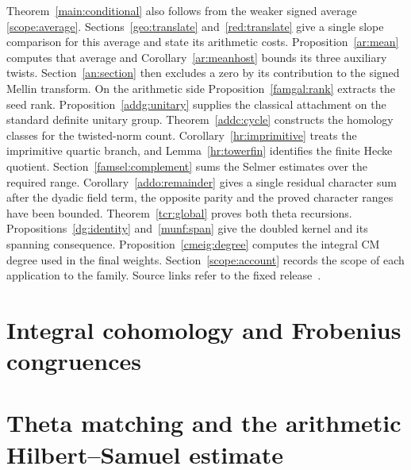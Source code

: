 \documentclass[11pt,a4paper]{article}
\theoremstyle{definition}
\theoremstyle{remark}
\numberwithin{equation}{section}
\begin{document}
Theorem~\ref{main:conditional} also follows from the weaker signed
average \eqref{scope:average}. Sections~\ref{geo:translate} and~\ref{red:translate} give a single slope comparison for this average and state its arithmetic costs. Proposition~\ref{ar:mean} computes
that average and Corollary~\ref{ar:meanhost} bounds its three
auxiliary twists. Section~\ref{an:section} then excludes a zero
by its contribution to the signed Mellin transform. On the
arithmetic side Proposition~\ref{famgal:rank} extracts the seed
rank. Proposition~\ref{addg:unitary} supplies the classical attachment
on the standard definite unitary group. Theorem~\ref{addc:cycle} constructs
the homology classes for the twisted-norm count.
Corollary~\ref{hr:imprimitive} treats the imprimitive
quartic branch, and Lemma~\ref{hr:towerfin} identifies the finite
Hecke quotient. Section~\ref{famsel:complement} sums the Selmer
estimates over the required range. Corollary~\ref{addo:remainder}
gives a single residual character sum after the dyadic field term,
the opposite parity and the proved character ranges have been bounded.
Theorem~\ref{tcr:global} proves both theta recursions.
Propositions~\ref{dg:identity} and~\ref{munf:span} give the doubled
kernel and its spanning consequence. Proposition~\ref{cmeig:degree}
computes the integral CM degree used in the final weights.
Section~\ref{scope:account} records the scope of each application
to the family. Source links refer to the fixed release~\cite{source}.







\section{Integral cohomology and Frobenius congruences}












\section{Theta matching and the arithmetic Hilbert--Samuel estimate}









\end{document}
